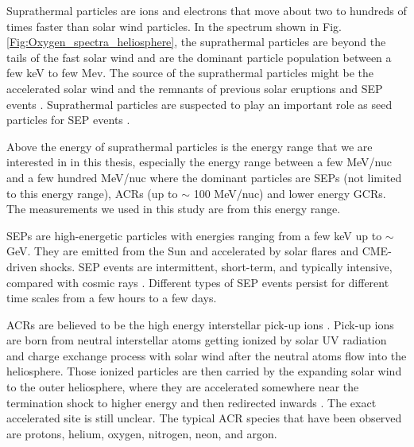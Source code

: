 
Suprathermal particles are ions and electrons that move about two to hundreds of times faster than solar wind particles. In the spectrum shown in Fig.\ref{Fig:Oxygen_spectra_heliosphere}, the suprathermal particles are beyond the tails of the fast solar wind and are the dominant particle population between a few keV to few Mev. The source of the suprathermal particles might be the accelerated solar wind and the remnants of previous solar eruptions and \ac{SEP} events \citep{Gloeckler1995SSRv}. Suprathermal particles are suspected to play an important role as seed particles for \ac{SEP} events \citep{Kahler2019ApJ}.

Above the energy of suprathermal particles is the energy range that we are interested in in this thesis, especially the energy range between a few MeV/nuc and a few hundred MeV/nuc where the dominant particles are \acp{SEP} (not limited to this energy range), \acp{ACR} (up to $\sim$ 100 MeV/nuc) and lower energy \acp{GCR}. The measurements we used in this study are from this energy range.

\acp{SEP} are high-energetic particles with energies ranging from a few keV up to $\sim$ GeV. They are emitted from the Sun and accelerated by solar flares and \ac{CME}-driven shocks. \acs{SEP} events are intermittent, short-term, and typically intensive, compared with cosmic rays \citep{Reames1999}. Different types of \acs{SEP} events persist for different time scales from a few hours to a few days. %

\acp{ACR} are believed to be the high energy interstellar pick-up ions \citep{Giacalone2022SSRv}. Pick-up ions are born from neutral interstellar atoms getting ionized by solar UV radiation and charge exchange process with solar wind after the neutral atoms flow into the heliosphere. Those ionized particles are then carried by the expanding solar wind to the outer heliosphere, where they are accelerated somewhere near the termination shock to higher energy and then redirected inwards \citep{russell2016space}. The exact accelerated site is still unclear. The typical \ac{ACR} species that have been observed are protons, helium, oxygen, nitrogen, neon, and argon. 

